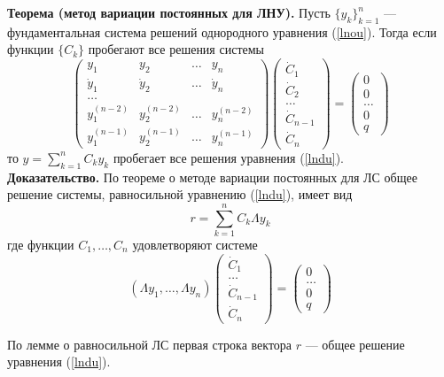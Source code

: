 \documentclass{article}
\begin{document}
\noindent \textbf{Теорема (метод вариации постоянных для ЛНУ).} Пусть $\{y_k\}_{k=1}^n$ --- фундаментальная система решений однородного уравнения (\ref{lnou}). Тогда если функции $\{C_k\}$ пробегают все решения системы
\begin{equation*}
    \begin{pmatrix}
    y_1 & y_2 & \ldots & y_n\\
    \dot{y}_1 & \dot{y}_2 & \ldots & \dot{y}_n\\
    \ldots\\
    y_1^{(n-2)} & y_2^{(n-2)} & \ldots & y_n^{(n-2)}\\
    y_1^{(n-1)} & y_2^{(n-1)} & \ldots & y_n^{(n-1)}
    \end{pmatrix}
    \begin{pmatrix}
    \dot{C}_{1}\\
    \dot{C}_{2}\\
    \ldots\\
    \dot{C}_{n-1}\\
    \dot{C}_{n}
    \end{pmatrix}
    =
    \begin{pmatrix}
    0\\
    0\\
    \ldots\\
    0\\
    q
    \end{pmatrix}
\end{equation*}
то $y = \displaystyle\sum_{k = 1}^n C_ky_k$ пробегает все решения уравнения (\ref{lndu}).\\

\noindent \textbf{Доказательство.} По теореме о методе вариации постоянных для ЛС общее решение системы, равносильной уравнению (\ref{lndu}), имеет вид
\begin{equation*}
    r = \sum_{k=1}^n C_k \Lambda y_k
\end{equation*}
где функции $C_1, \ldots, C_n$ удовлетворяют системе
\begin{equation*}
    (\Lambda y_1, \ldots, \Lambda y_n)
    \begin{pmatrix}
    \dot{C}_{1}\\
    \ldots\\
    \dot{C}_{n-1}\\
    \dot{C}_{n}
    \end{pmatrix}
    =
    \begin{pmatrix}
    0\\
    \ldots\\
    0\\
    q
    \end{pmatrix}
\end{equation*}

По лемме о равносильной ЛС первая строка вектора $r$ --- общее решение уравнения (\ref{lndu}).
\end{document}
